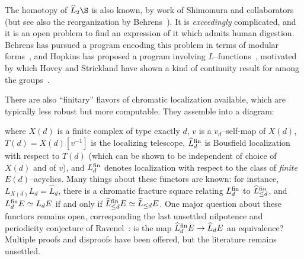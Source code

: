 \begin{remark}
The homotopy of $\widehat L_2 \S$ is also known, by work of Shimomura and collaborators~\cite{Shimomura,ShimomuraYabeM20,ShimomuraYabeL2S} (but see also the reorganization by Behrens~\cite{BehrensRevisited}).  It is \emph{exceedingly} complicated, and it is an open problem to find an expression of it which admits human digestion.  Behrens has pursued a program encoding this problem in terms of modular forms~\cite{BehrensCongruences,BehrensModularDescription,BehrensBuildings}, and Hopkins has proposed a program involving $L$--functions~\cite{StricklandpAdicInterpolation}, motivated by which Hovey and Strickland have shown a kind of continuity result for among the groups~\cite[Section 14]{HoveyStrickland}.
\end{remark}





\begin{remark}
There are also ``finitary'' flavors of chromatic localization available, which are typically less robust but more computable.  They assemble into a diagram:
\begin{center}
\end{center}
where $X(d)$ is a finite complex of type exactly $d$, $v$ is a $v_d$--self-map of $X(d)$, $T(d) = X(d)[v^{-1}]$ is the localizing telescope, $\widehat L_d^{\mathrm{fin}}$ is Bousfield localization with respect to $T(d)$ (which can be shown to be independent of choice of $X(d)$ and of $v$), and $L_d^{\mathrm{fin}}$ denotes localization with respect to the class of \emph{finite} $E(d)$--acyclics.  Many things about these functors are known: for instance, $L_{X(d)} L_d = \widehat L_d$, there is a chromatic fracture square relating $L_d^{\mathrm{fin}}$ to $\widehat L_{\le d}^{\mathrm{fin}}$, and $L_d^{\mathrm{fin}} E \simeq L_d E$ if and only if $\widehat L_{\le d}^{\mathrm{fin}} E \simeq \widehat L_{\le d} E$.  One major question about these functors remains open, corresponding the last unsettled nilpotence and periodicity conjecture of Ravenel~\cite[Conjecture 10.5]{RavenelLocalizationWRTPeriodic}: is the map $\widehat L_d^{\mathrm{fin}} E \to \widehat L_d E$ an equivalence?  Multiple proofs and disproofs have been offered, but the literature remains unsettled.
\end{remark}







